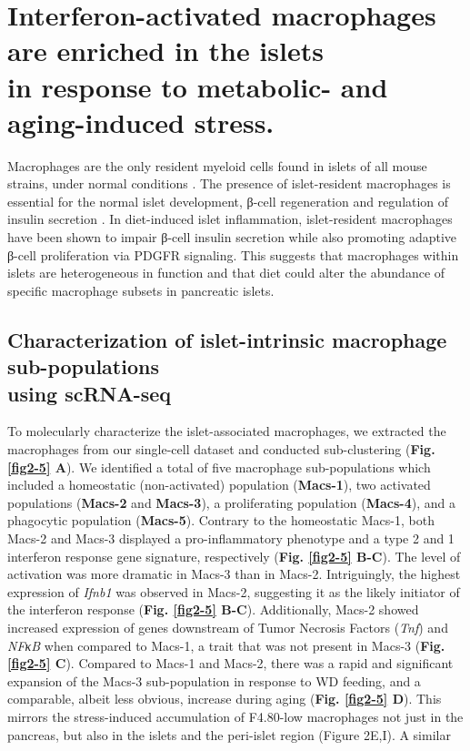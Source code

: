
\section{Interferon-activated macrophages are enriched in the islets\\in response to metabolic- and aging-induced stress.}
\label{sec:sc_macs}

Macrophages are the only resident myeloid cells found in islets of all mouse strains, under normal conditions \textbf{\cite{zakharov_single-cell_2020}}. The presence of islet-resident macrophages is essential for the normal islet development, β-cell regeneration and regulation of insulin secretion \textbf{\cite{ying_expansion_2019}}. In diet-induced islet inflammation, islet-resident macrophages have been shown to impair β-cell insulin secretion while also promoting adaptive β-cell proliferation via PDGFR signaling. This suggests that macrophages within islets are heterogeneous in function and that diet could alter the abundance of specific macrophage subsets in pancreatic islets.
\subsection{Characterization of islet-intrinsic macrophage sub-populations\\using scRNA-seq}
To molecularly characterize the islet-associated macrophages, we extracted the macrophages from our single-cell dataset and conducted sub-clustering (\textbf{Fig. \ref{fig2-5} A}). We identified a total of five macrophage sub-populations which included a homeostatic (non-activated) population (\textbf{Macs-1}), two activated populations (\textbf{Macs-2} and \textbf{Macs-3}), a proliferating population (\textbf{Macs-4}), and a phagocytic population (\textbf{Macs-5}). Contrary to the homeostatic Macs-1, both Macs-2 and Macs-3 displayed a pro-inflammatory phenotype and  a type 2 and 1 interferon response gene signature, respectively (\textbf{Fig. \ref{fig2-5} B-C}). The level of activation was more dramatic in Macs-3 than in Macs-2. Intriguingly, the highest expression of \textit{Ifnb1} was observed in Macs-2, suggesting it as the likely initiator of the interferon response (\textbf{Fig. \ref{fig2-5} B-C}). Additionally, Macs-2 showed increased expression of genes downstream of Tumor Necrosis Factors (\textit{Tnf}) and \textit{NFκB} when compared to Macs-1, a trait that was not present in Macs-3 (\textbf{Fig. \ref{fig2-5} C}). Compared to Macs-1 and Macs-2, there was a rapid and significant expansion of the Macs-3 sub-population in response to WD feeding, and a comparable, albeit less obvious, increase during aging (\textbf{Fig. \ref{fig2-5} D}). This mirrors the stress-induced accumulation of F4.80-low macrophages not just in the pancreas, but also in the islets and the peri-islet region (Figure 2E,I). A similar 

